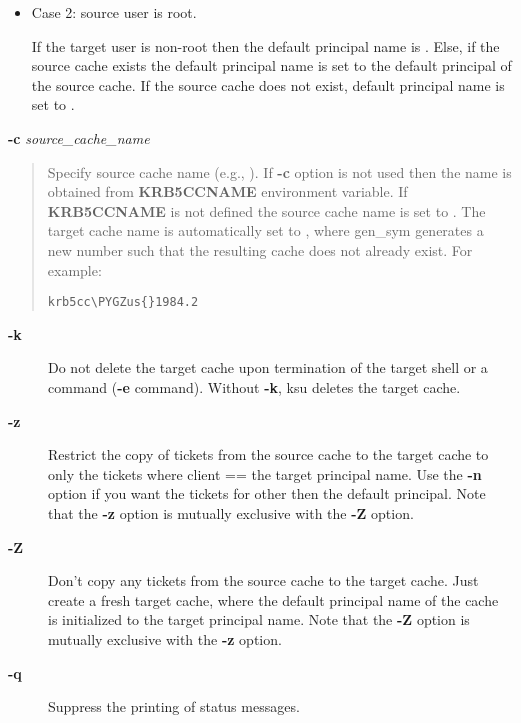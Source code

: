 \documentclass[letterpaper,10pt,english]{sphinxmanual}
\def\PYGZus{\char`\_}
\begin{document}
\begin{description}
\begin{itemize}
\item {} 
Case 2: source user is root.

If the target user is non-root then the default principal name
is .  Else, if the source cache
exists the default principal name is set to the default
principal of the source cache.  If the source cache does not
exist, default principal name is set to .

\end{itemize}

\end{description}

\textbf{-c} \emph{source\_cache\_name}
\begin{quote}

Specify source cache name (e.g., ).  If
\textbf{-c} option is not used then the name is obtained from
\textbf{KRB5CCNAME} environment variable.  If \textbf{KRB5CCNAME} is not
defined the source cache name is set to .
The target cache name is automatically set to , where gen\_sym generates a new number such that
the resulting cache does not already exist.  For example:

\begin{Verbatim}[commandchars=\\\{\}]
krb5cc\PYGZus{}1984.2
\end{Verbatim}
\end{quote}
\begin{description}
\item[{\textbf{-k}}] \leavevmode
Do not delete the target cache upon termination of the target
shell or a command (\textbf{-e} command).  Without \textbf{-k}, ksu deletes
the target cache.

\item[{\textbf{-z}}] \leavevmode
Restrict the copy of tickets from the source cache to the target
cache to only the tickets where client == the target principal
name.  Use the \textbf{-n} option if you want the tickets for other then
the default principal.  Note that the \textbf{-z} option is mutually
exclusive with the \textbf{-Z} option.

\item[{\textbf{-Z}}] \leavevmode
Don't copy any tickets from the source cache to the target cache.
Just create a fresh target cache, where the default principal name
of the cache is initialized to the target principal name.  Note
that the \textbf{-Z} option is mutually exclusive with the \textbf{-z}
option.

\item[{\textbf{-q}}] \leavevmode
Suppress the printing of status messages.

\end{description}
\end{document}
